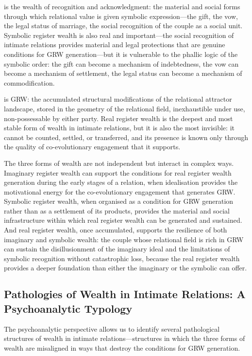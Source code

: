  is the wealth of recognition and acknowledgment: the material and social forms through which relational value is given symbolic expression---the gift, the vow, the legal status of marriage, the social recognition of the couple as a social unit. Symbolic register wealth is also real and important---the social recognition of intimate relations provides material and legal protections that are genuine conditions for GRW generation---but it is vulnerable to the phallic logic of the symbolic order: the gift can become a mechanism of indebtedness, the vow can become a mechanism of settlement, the legal status can become a mechanism of commodification.

 is GRW: the accumulated structural modifications of the relational attractor landscape, stored in the geometry of the relational field, inexhaustible under use, non-possessable by either party. Real register wealth is the deepest and most stable form of wealth in intimate relations, but it is also the most invisible: it cannot be counted, settled, or transferred, and its presence is known only through the quality of co-evolutionary engagement that it supports.

The three forms of wealth are not independent but interact in complex ways. Imaginary register wealth can support the conditions for real register wealth generation during the early stages of a relation, when idealisation provides the motivational energy for the co-evolutionary engagement that generates GRW. Symbolic register wealth, when organised as a condition for GRW generation rather than as a settlement of its products, provides the material and social infrastructure within which real register wealth can be generated and sustained. And real register wealth, once accumulated, supports the resilience of both imaginary and symbolic wealth: the couple whose relational field is rich in GRW can sustain the disillusionment of the imaginary ideal and the limitations of symbolic recognition without catastrophic loss, because the real register wealth provides a deeper foundation than either the imaginary or the symbolic can offer.

\subsection{Pathologies of Wealth in Intimate Relations: A Psychoanalytic Typology}
\label{p15:subsec:pathologies}

\noindent
The psychoanalytic perspective allows us to identify several pathological structures of wealth in intimate relations---structures in which the three forms of wealth are misaligned in ways that destroy the conditions for GRW generation.

